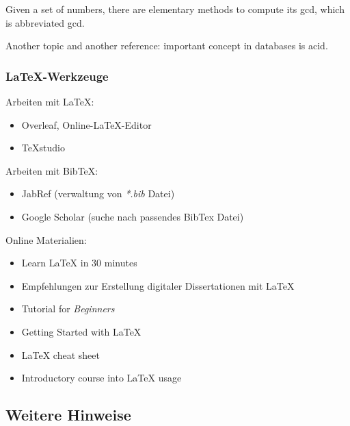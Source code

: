 \documentclass[11pt]{scrartcl}
\newcommand{\href}[2]{#2}
\begin{document}
Given a set of numbers, there are elementary methods to compute its \acrlong{gcd}, which is abbreviated \acrshort{gcd}. 

Another topic and another reference: important concept in databases is \acrfull{acid}.

\subsubsection{LaTeX-Werkzeuge}

Arbeiten mit LaTeX:

\begin{itemize}
	\item \href{https://overleaf.com/}{Overleaf, Online-LaTeX-Editor}
	\item \href{http://www.texstudio.org/}{TeXstudio}
\end{itemize}

Arbeiten mit BibTeX:

\begin{itemize}
	\item \href{http://www.jabref.org/}{JabRef} (verwaltung von \textit{*.bib} Datei)
	\item \href{https://scholar.google.de/}{Google Scholar} (suche nach passendes BibTex Datei)
\end{itemize}		

Online Materialien:

\begin{itemize}
	\item \href{https://www.overleaf.com/learn/latex/Learn_LaTeX_in_30_minutes}{Learn LaTeX in 30 minutes}
	\item \href{http://www.dnb.de/DE/Wir/Projekte/Archiv/dissonlineTutor.html}{Empfehlungen zur Erstellung digitaler Dissertationen mit LaTeX}
	\item \href{http://www.latex-tutorial.com/tutorials/beginners/}{Tutorial for \textit{Beginners}}
	\item \href{http://www.math.uiuc.edu/~hildebr/tex/latex-start.html}{Getting Started with LaTeX}
	\item \href{http://wch.github.io/latexsheet/}{LaTeX cheat sheet}
	\item \href{https://github.com/vdmitriyev/latex-intro}{Introductory course into LaTeX usage}
\end{itemize}				

\subsection{Weitere Hinweise}
\end{document}
